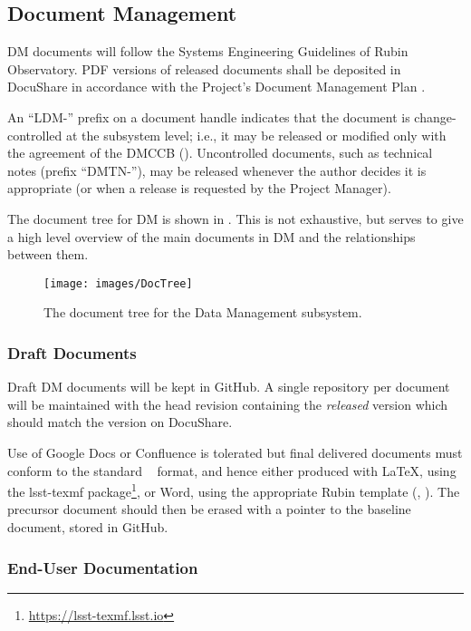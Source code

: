 \subsection {Document Management} \label{sect:docman}

DM  documents will follow the \gls{Systems Engineering} Guidelines of Rubin Observatory. PDF versions of released documents shall be deposited in \gls{DocuShare} in accordance with the Project's Document Management Plan .

An ``LDM-'' prefix on a document handle indicates that the document is change-controlled at the subsystem level; i.e., it may be released or modified only with the agreement of the DMCCB (). Uncontrolled documents, such as technical notes (prefix ``DMTN-''), may be released whenever the author decides it is appropriate (or when a release is requested by the Project Manager).

The document tree for DM is shown in . This is not exhaustive, but serves to give a high level overview of the main documents in DM and the relationships between them.

\begin{figure}
\begin{center}
 \texttt{[image: images/DocTree]}
\caption{The document tree for the \gls{Data Management} subsystem.\label{fig:doctree}}
\end{center}
\end{figure}

\subsubsection{Draft Documents}

Draft DM documents will be kept in GitHub. A single repository per document will be maintained with the head revision containing the \emph{released} version which should match the version on \gls{DocuShare}.

Use of Google Docs or Confluence is tolerated but final delivered documents must conform to the standard \VRO~  format, and hence either produced with \gls{LaTeX}, using the lsst-texmf package\footnote{\url{https://lsst-texmf.lsst.io}}, or Word, using the appropriate Rubin template (, ). The precursor document should then be erased with a pointer to the baseline document, stored in GitHub.

\subsubsection{End-User Documentation}

